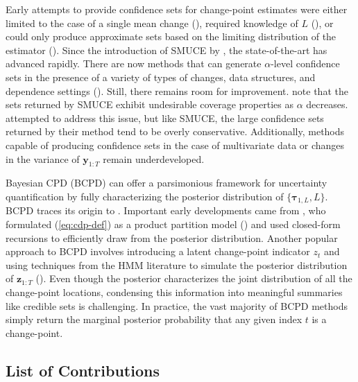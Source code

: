 Early attempts to provide confidence sets for change-point estimates were either limited to the case of a single mean change (\citealp{Siegmund86, Worsley86,Jirak15,Horvath17}), required knowledge of $L$ (\citealp{Bai03}), or could only produce approximate sets based on the limiting distribution of the estimator (\citealp{Bai10}). Since the introduction of SMUCE by \cite{Frick14}, the state-of-the-art has advanced rapidly. There are now methods that can generate $\alpha$-level confidence sets in the presence of a variety of types of changes, data structures, and dependence settings (\citealp{Pein17, Eichinger18, Dette20, Fang20, fang2021detectionestimationlocalsignals, Chen22, Cho22, madrid2023change, Fryzlewicz24median, Fryzlewicz24}). Still, there remains room for improvement. \cite{chen2014discussion} note that the sets returned by SMUCE exhibit undesirable coverage properties as $\alpha$ decreases. \cite{Fryzlewicz24} attempted to address this issue, but like SMUCE, the large confidence sets returned by their method tend to be overly conservative. Additionally, methods capable of producing confidence sets in the case of multivariate data or changes in the variance of $\mathbf{y}_{1:T}$ remain underdeveloped.

Bayesian CPD (BCPD) can offer a parsimonious framework for uncertainty quantification by fully characterizing the posterior distribution of $\{\boldsymbol{\tau}_{1,L}, L\}$. BCPD traces its origin to \cite{chernoff1964estimating}. Important early developments came from \cite{Barry93}, who formulated (\ref{eq:cdp-def}) as a product partition model (\citealp{Hartigan90, Barry92}) and used closed-form recursions to efficiently draw from the posterior distribution. Another popular approach to BCPD involves introducing a latent change-point indicator $z_t$ and using techniques from the HMM literature to simulate the posterior distribution of $\mathbf{z}_{1:T}$ (\citealp{Chib98, Fearnhead06, Nam12, Harle16,Fan17}). Even though the posterior characterizes the joint distribution of all the change-point locations, condensing this information into meaningful summaries like credible sets is challenging. In practice, the vast majority of BCPD methods simply return the marginal posterior probability that any given index $t$ is a change-point. %

\subsection{List of Contributions}

